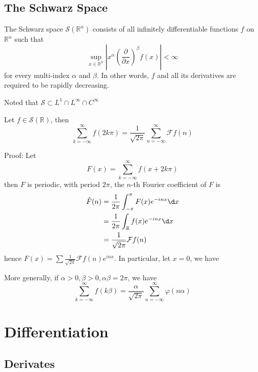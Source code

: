 \documentclass[12pt, a4paper, oneside]{book}
\begin{document}
\section{The Schwarz Space}
\begin{definition}
    The Schwarz space $\mathcal{S}(\mathbb{R}^n)$ consists of all infinitely differentiable functions $f$ on $\mathbb{R}^n$ such that
    $$\sup_{x\in \mathbb{R}^n} \left|x^\alpha \left(\frac{\partial}{\partial x}\right)^\beta f(x)\right| < \infty$$
    for every multi-index $\alpha$ and $\beta$. In other words, $f$ and all its derivatives are required to be rapidly decreasing.

    Noted that $\mathcal{S}\subset L^1\cap L^\infty \cap C^\infty $
\end{definition}
\begin{theorem}
    Let $f \in \mathcal{S}(\mathbb{R})$, then
    $$
        \sum_{k=-\infty}^{\infty} f(2 k \pi)
        =
        \frac{1}{\sqrt{2\pi}}\sum_{n=-\infty}^{\infty}  \mathcal{F}f(n)
    $$

    Proof: Let
    $$
        F(x)=\sum_{k=-\infty}^{\infty} f(x+2 k \pi)
    $$
    then $F$ is periodic, with period $2 \pi$, the $n$-th Fourier coefficient of $F$ is
    $$\begin{aligned}
            \hat{F}(n) & =\frac{1}{2\pi} \int_{-\pi}^\pi F(x) e^{-inx} \d x \\
                       & =\frac{1}{2\pi} \int_\mathbb{R} f(x) e^{-inx} \d x \\
                       & =\frac{1}{\sqrt{2\pi}} \mathcal{F}f(n)
        \end{aligned}
    $$
    hence $F(x)=\sum \frac{1}{\sqrt{2\pi}} \mathcal{F}f(n) e^{i n x}$. In particular, let $x=0$, we have


    More generally, if $\alpha>0, \beta>0, \alpha \beta=2 \pi$,    we have
    $$
        \sum_{k=-\infty}^{\infty} f(k \beta)=\frac{\alpha}{\sqrt{2 \pi}} \sum_{n=-\infty}^{\infty} \varphi(n \alpha)
    $$
\end{theorem}













\chapter{Differentiation}
\section{Derivates}
\end{document}
